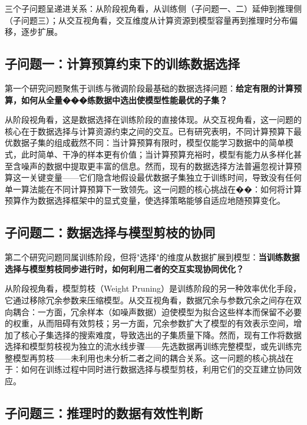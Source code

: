 三个子问题呈递进关系：从阶段视角看，从训练侧（子问题一、二）延伸到推理侧（子问题三）；从交互视角看，交互维度从计算资源到模型容量再到推理时分布偏移，逐步扩展。

\subsection{子问题一：计算预算约束下的训练数据选择}

第一个研究问题聚焦于训练与微调阶段最基础的数据选择问题：\textbf{给定有限的计算预算，如何从全量���练数据中选出使模型性能最优的子集？}

从阶段视角看，这是数据选择在训练阶段的直接体现。从交互视角看，这一问题的核心在于数据选择与计算资源约束之间的交互。已有研究表明，不同计算预算下最优数据子集的组成截然不同\cite{sorscher2022beyond, yin2024compute}：当计算预算有限时，模型仅能学习数据中的简单模式，此时简单、干净的样本更有价值；当计算预算充裕时，模型有能力从多样化甚至含噪声的数据中提取更丰富的信息。然而，现有的数据选择方法普遍忽视计算预算这一关键变量——它们隐含地假设最优数据子集独立于训练时间\cite{killamsetty2021grad, paul2021deep, toneva2018empirical}，导致没有任何单一算法能在不同计算预算下一致领先\cite{xia2024rethinking}。这一问题的核心挑战在��：如何将计算预算作为数据选择框架中的显式变量，使选择策略能够自适应地随预算变化。

\subsection{子问题二：数据选择与模型剪枝的协同}

第二个研究问题同属训练阶段，但将"选择"的维度从数据扩展到模型：\textbf{当训练数据选择与模型剪枝同步进行时，如何利用二者的交互实现协同优化？}

从阶段视角看，模型剪枝（Weight Pruning）是训练阶段的另一种效率优化手段，它通过移除冗余参数来压缩模型\cite{han2015learning, lecun1989optimal}。从交互视角看，数据冗余与参数冗余之间存在双向耦合：一方面，冗余样本（如噪声数据）迫使模型为拟合这些样本而保留不必要的权重，从而阻碍有效剪枝；另一方面，冗余参数扩大了模型的有效表示空间，增加了核心子集选择的搜索难度，导致选出的子集质量下降。然而，现有工作将数据选择和模型剪枝视为独立的流水线步骤——先选数据再训练完整模型，或先训练完整模型再剪枝——未利用也未分析二者之间的耦合关系\cite{evci2020rigging, killamsetty2021grad}。这一问题的核心挑战在于：如何在训练过程中同时进行数据选择与模型剪枝，利用它们的交互建立协同效应。

\subsection{子问题三：推理时的数据有效性判断}

